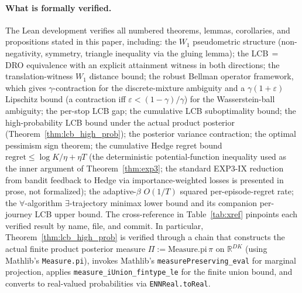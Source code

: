 \documentclass[opre,dblanonrev]{informs4}
\begin{document}
\paragraph{What is formally verified.}
The Lean development verifies all numbered theorems, lemmas,
corollaries, and propositions stated in this paper, including:
the $W_1$ pseudometric structure (non-negativity, symmetry, triangle
inequality via the gluing lemma); the LCB$\,=\,$DRO equivalence
with an explicit attainment witness in both directions; the
translation-witness $W_1$ distance bound; the robust Bellman
operator framework, which gives $\gamma$-contraction for the
discrete-mixture ambiguity and a $\gamma(1{+}\varepsilon)$
Lipschitz bound (a contraction iff $\varepsilon<(1-\gamma)/\gamma$)
for the Wasserstein-ball ambiguity; the
per-stop LCB gap; the cumulative LCB suboptimality bound; the
high-probability LCB bound under the actual product posterior
(Theorem~\ref{thm:lcb_high_prob}); the posterior variance contraction;
the optimal pessimism sign theorem; the cumulative Hedge regret bound
$\mathrm{regret} \leq \log K / \eta + \eta T$ (the deterministic
potential-function inequality used as the inner argument of
Theorem~\ref{thm:exp3}; the standard EXP3-IX reduction from bandit
feedback to Hedge via importance-weighted losses is presented in
prose, not formalized); the adaptive-$\beta$
$O(1/T)$ squared per-episode-regret rate; the $\forall$-algorithm
$\exists$-trajectory minimax lower bound and its companion
per-journey LCB upper bound.
The cross-reference in Table~\ref{tab:xref} pinpoints each verified
result by name, file, and commit. In particular,
Theorem~\ref{thm:lcb_high_prob} is verified through a chain that
constructs the actual finite product posterior measure
$\Pi := \mathrm{Measure.pi}\,\pi$ on $\mathbb{R}^{DK}$ (using
Mathlib's \texttt{Measure.pi}), invokes Mathlib's
\texttt{measurePreserving\_eval} for marginal projection, applies
\texttt{measure\_iUnion\_fintype\_le} for the finite union bound,
and converts to real-valued probabilities via \texttt{ENNReal.toReal}.
\end{document}
